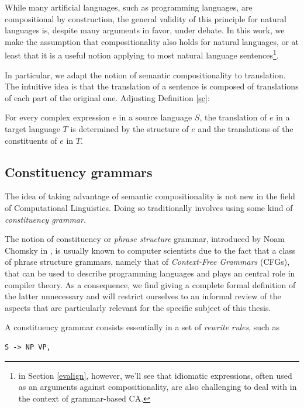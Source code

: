 While many artificial languages, such as programming languages, are compositional by construction, the general validity of this principle for natural languages is, despite many arguments in favor, under debate. In this work, we make the assumption that compositionality also holds for natural languages, or at least that it is a useful notion applying to most natural language sentences\footnote{in Section \ref{evalign}, however, we'll see that idiomatic expressions, often used as an arguments against compositionality, are also challenging to deal with in the context of grammar-based CA.}. \smallskip

In particular, we adapt the notion of semantic compositionality to translation. 
The intuitive idea is that the translation of a sentence is composed of translations of each part of the original one. Adjusting Definition \ref{sc}:

\begin{definition}
    For every complex expression $e$ in a source language $S$, the translation of $e$ in a target language $T$ is determined by the structure of $e$ and the translations of the constituents of $e$ in $T$.
\end{definition}

\subsection{Constituency grammars}
The idea of taking advantage of semantic compositionality is not new in the field of Computational Linguistics. Doing so traditionally involves using some kind of \textit{constituency grammar}. \smallskip

The notion of constituency or \textit{phrase structure} grammar, introduced by Noam Chomsky in \cite{chomsky}, is usually known to computer scientists due to the fact that a class of phrase structure grammars, namely that of \textit{Context-Free Grammars} (CFGs), that can be used to describe programming languages and plays an central role in compiler theory. 
As a consequence, we find giving a complete formal definition of the latter unnecessary and will restrict ourselves to an informal review of the aspects that are particularly relevant for the specific subject of this thesis. \smallskip

A constituency grammar consists essentially in a set of \textit{rewrite rules}, such as 

\begin{lstlisting}[frame=none]
    S -> NP VP,
\end{lstlisting}

